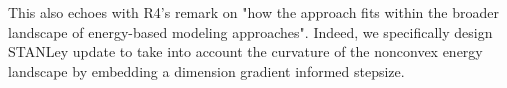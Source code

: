 \documentclass[10pt,twocolumn,letterpaper]{article}
\begin{document}
This also echoes with R4's remark on "how the approach fits within the broader landscape of energy-based modeling approaches". 
Indeed, we specifically design STANLey update to take into account the curvature of the nonconvex energy landscape by embedding a dimension gradient informed stepsize.




% 
% 
\end{document}
